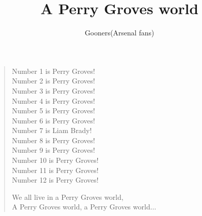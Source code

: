 \documentclass[a4paper,12pt]{article}
\title{A Perry Groves world}
\author{Gooners(Arsenal fans)}
\date{}
\begin{document}
	
	\maketitle
	
	\begin{verse}
		
		Number 1 is Perry Groves! \\
		Number 2 is Perry Groves! \\
		Number 3 is Perry Groves! \\
		Number 4 is Perry Groves! \\
		Number 5 is Perry Groves! \\
		Number 6 is Perry Groves! \\
		Number 7 is Liam Brady! \\
		Number 8 is Perry Groves! \\
		Number 9 is Perry Groves! \\
		Number 10 is Perry Groves! \\
		Number 11 is Perry Groves! \\
		Number 12 is Perry Groves!\par 
		We all live in a Perry Groves world, \\
		A Perry Groves world, a Perry Groves world$\ldots$
		
	\end{verse}
	
\end{document}
